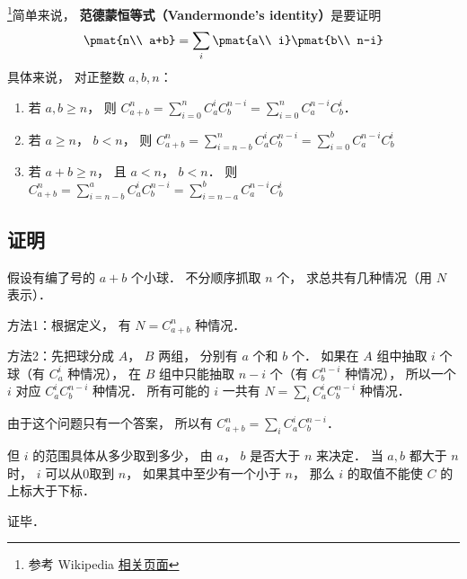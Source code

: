 

\footnote{参考 Wikipedia \href{https://en.wikipedia.org/wiki/Vandermonde's_identity}{相关页面}}简单来说， \textbf{范德蒙恒等式（Vandermonde's identity）}是要证明
\begin{equation}
\pmat{n\\ a+b} = \sum_i \pmat{a\\ i} \pmat{b\\ n-i}
\end{equation}
具体来说， 对正整数 $a,b,n$：
\begin{enumerate}
\item 若 $a,b \geqslant n$，  则 $C_{a + b}^n = \sum\limits_{i = 0}^n C_a^iC_b^{n - i}  = \sum\limits_{i = 0}^n C_a^{n - i} C_b^i$． 
\item 若 $a \geqslant n$，  $b < n$，   则  $C_{a + b}^n = \sum\limits_{i = n - b}^n C_a^iC_b^{n - i}  = \sum\limits_{i = 0}^b C_a^{n - i} C_b^i$ 
\item 若 $a + b \geqslant n$，   且 $a < n$，   $b < n$．  则  $C_{a + b}^n = \sum\limits_{i = n - b}^a C_a^i C_b^{n - i}  = \sum\limits_{i = n - a}^b C_a^{n - i} C_b^i$ 
\end{enumerate}

\subsection{证明}

假设有编了号的 $a+b$ 个小球． 不分顺序抓取 $n$ 个， 求总共有几种情况（用 $N$ 表示）．

方法1：根据定义， 有 $N = C_{a + b}^n$ 种情况．

方法2：先把球分成 $A$，  $B$ 两组， 分别有 $a$ 个和 $b$ 个． 如果在 $A$ 组中抽取 $i$ 个球（有 $C_a^i$ 种情况）， 在 $B$ 组中只能抽取  $n - i$ 个（有 $C_b^{n - i}$ 种情况）， 所以一个 $i$ 对应 $C_a^i C_b^{n - i}$ 种情况． 所有可能的 $i$ 一共有 $N = \sum_i C_a^i C_b^{n - i}$ 种情况．

由于这个问题只有一个答案， 所以有 $C_{a + b}^n = \sum_i C_a^i C_b^{n - i}$． 

但 $i$ 的范围具体从多少取到多少， 由 $a$，  $b$ 是否大于 $n$ 来决定． 当 $a,b$ 都大于 $n$ 时， $i$ 可以从0取到 $n$，  如果其中至少有一个小于 $n$，  那么 $i$ 的取值不能使 $C$ 的上标大于下标．

证毕．


